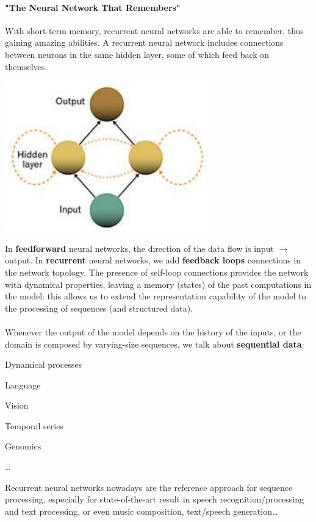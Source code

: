 \documentclass[10pt]{report}
\begin{document}
\paragraph{"The Neural Network That Remembers"} With short-term memory, recurrent neural networks are able to remember, thus gaining amazing abilities. A recurrent neural network includes connections between neurons in the same hidden layer, some of which feed back on themselves.
\begin{center}
	\includegraphics[scale=0.75]{33.png}
\end{center}
In \textbf{feedforward} neural networks, the direction of the data flow is input $\rightarrow$ output. In \textbf{recurrent} neural networks, we add \textbf{feedback loops} connections in the network topology. The presence of self-loop connections provides the network with dynamical properties, leaving a memory (states) of the past computations in the model: this allows us to extend the representation capability of the model to the processing of sequences (and structured data).\\\\
Whenever the output of the model depends on the history of the inputs, or the domain is composed by varying-size sequences, we talk about \textbf{sequential data}:
\begin{list}{}{}
	\item Dynamical processes
	\item Language
	\item Vision
	\item Temporal series
	\item Genomics
	\item \ldots
\end{list}
Recurrent neural networks nowadays are the reference approach for sequence processing, especially for state-of-the-art result in speech recognition/processing and text processing, or even music composition, text/speech generation\ldots\\
\end{document}
